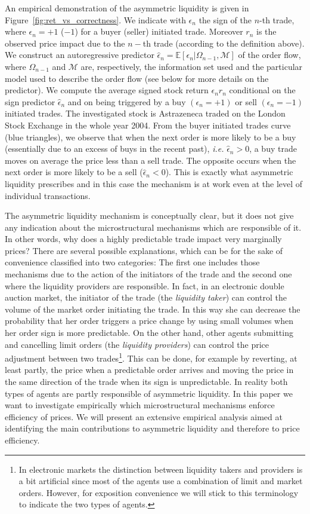 \documentclass[12pt]{iopart}
\begin{document}
An empirical demonstration of the asymmetric liquidity is given in Figure~\ref{fig:ret_vs_correctness}. We indicate with $\epsilon_n$ the sign of the $n$-th trade, where $\epsilon_n=+1$ ($-1$) for a buyer (seller) initiated trade. Moreover $r_n$ is the observed price impact due to the $n-$th trade (according to the definition above). We construct an autoregressive predictor $\hat{\epsilon}_n=\mathbb{E}[\epsilon_n|\Omega_{n-1},\mathcal{M}]$ of the order flow, where $\Omega_{n-1}$ and $\mathcal{M}$ are, respectively, the information set used and the particular model used to describe the order flow (see below for more details on the predictor). We compute the average signed stock return $\epsilon_n r_n$ conditional on the sign predictor $\hat{\epsilon}_n$ and on being triggered by a buy $(\epsilon_n=+1)$ or sell $(\epsilon_n=-1)$ initiated trades. The investigated stock is Astrazeneca traded on the London Stock Exchange in the whole year 2004. From the buyer initiated trades curve (blue triangles), we observe that when the next order is more likely to be a buy (essentially due to an excess of buys in the recent past), \textit{i.e.} $\hat{\epsilon}_n>0$, a buy trade moves on average the price less than a sell trade. The opposite occurs when the next order is more likely to be a sell ($\hat{\epsilon}_n<0$). This is exactly what asymmetric liquidity prescribes and in this case the mechanism is at work even at the level of individual transactions. 

The asymmetric liquidity mechanism is conceptually clear, but it does not give any indication about the microstructural mechanisms which are responsible of it. In other words, why does a highly predictable trade impact very marginally prices? There are several possible explanations, which can be for the sake of convenience classified into two categories: The first one includes those mechanisms due to the action of the initiators of the trade and the second one where the liquidity providers are responsible. In fact, in an electronic double auction market, the initiator of the trade (the \textit{liquidity taker}) can control the volume of the market order initiating the trade. In this way she can decrease the probability that her order triggers a price change by using small volumes when her order sign is more predictable.  On the other hand, other agents submitting and cancelling limit orders (the \textit{liquidity providers}) can control the price adjustment between two trades\footnote{In electronic markets the distinction between liquidity takers and providers is a bit artificial since most of the agents use a combination of limit and market orders. However, for exposition convenience we will stick to this terminology to indicate the two types of agents.}. This can be done, for example by reverting, at least partly, the price when a predictable order arrives and moving the price in the same direction of the trade when its sign is unpredictable. In reality both types of agents are partly responsible of asymmetric liquidity. In this paper we want to investigate empirically which microstructural mechanisms enforce efficiency of prices. We will present an extensive empirical analysis aimed at identifying the main contributions to asymmetric liquidity and therefore to price efficiency.
\end{document}

